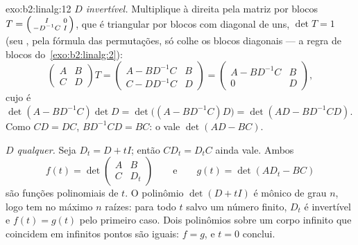 \begin{solution}{exo:b2:linalg:12}
\emph{$D$ invertível.} Multiplique à direita pela matriz por blocos
$T = \begin{psmallmatrix} I & 0\\ -D^{-1}C & I\end{psmallmatrix}$,
que é triangular por blocos com diagonal de uns, $\det T = 1$ (seu
, pela fórmula das permutações, só colhe os blocos
diagonais --- a regra de blocos do~\cref{exo:b2:linalg:2}):
\[
\begin{pmatrix} A & B\\ C & D\end{pmatrix} T
= \begin{pmatrix} A - BD^{-1}C & B\\ C - DD^{-1}C & D\end{pmatrix}
= \begin{pmatrix} A - BD^{-1}C & B\\ 0 & D\end{pmatrix},
\]
cujo  é $\det(A - BD^{-1}C)\det D = \det\bigl((A -
BD^{-1}C)D\bigr) = \det(AD - BD^{-1}CD)$. Como $CD = DC$,
$BD^{-1}CD = BC$: o  vale $\det(AD - BC)$.

\emph{$D$ qualquer.} Seja $D_t = D + tI$; então $CD_t = D_tC$ ainda vale.
Ambos
\[
f(t) = \det\begin{pmatrix} A & B\\ C & D_t\end{pmatrix}
\qquad\text{e}\qquad
g(t) = \det(AD_t - BC)
\]
são funções polinomiais de $t$. O polinômio $\det(D + tI)$ é
mônico de grau $n$, logo tem no máximo $n$ raízes: para todo $t$ salvo um número
finito, $D_t$ é invertível e $f(t) = g(t)$ pelo
primeiro caso. Dois polinômios sobre um corpo infinito que coincidem em
infinitos pontos são iguais: $f = g$, e $t = 0$ conclui.
\end{solution}

